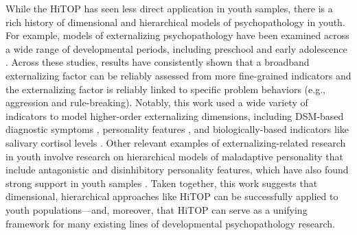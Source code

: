 \documentclass[
  20pt,
  number,
  preprint,
  3p,
  twocolumn]{elsarticle}
\begin{document}
While the HiTOP has seen less direct application in youth samples, there
is a rich history of dimensional and hierarchical models of
psychopathology in youth. For example, models of externalizing
psychopathology have been examined across a wide range of developmental
periods, including preschool \citep[e.g.,][]{hill2006} and early
adolescence \citep[e.g.,][]{goulter2022}. Across these studies, results
have consistently shown that a broadband externalizing factor can be
reliably assessed from more fine-grained indicators and the
externalizing factor is reliably linked to specific problem behaviors
(e.g., aggression and rule-breaking). Notably, this work used a wide
variety of indicators to model higher-order externalizing dimensions,
including DSM-based diagnostic symptoms \citep[e.g.,][]{king2018},
personality features \citep[e.g.,][]{tackett2014}, and
biologically-based indicators like salivary cortisol levels
\citep[e.g.,][]{shirtcliff2005}. Other relevant examples of
externalizing-related research in youth involve research on hierarchical
models of maladaptive personality that include antagonistic and
disinhibitory personality features, which have also found strong support
in youth samples \citep[e.g.,][]{fruyt2014}. Taken together, this work
suggests that dimensional, hierarchical approaches like HiTOP can be
successfully applied to youth populations---and, moreover, that HiTOP
can serve as a unifying framework for many existing lines of
developmental psychopathology research.
\end{document}
